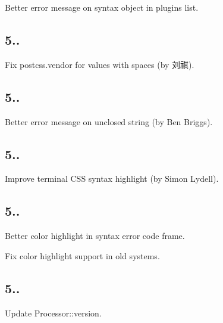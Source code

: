 \begin{DoxyItemize}
\item Better error message on syntax object in plugins list.
\end{DoxyItemize}

\subsection*{5..}


\begin{DoxyItemize}
\item Fix {\ttfamily postcss.\+vendor} for values with spaces (by 刘祺).
\end{DoxyItemize}

\subsection*{5..}


\begin{DoxyItemize}
\item Better error message on unclosed string (by Ben Briggs).
\end{DoxyItemize}

\subsection*{5..}


\begin{DoxyItemize}
\item Improve terminal C\+SS syntax highlight (by Simon Lydell).
\end{DoxyItemize}

\subsection*{5..}


\begin{DoxyItemize}
\item Better color highlight in syntax error code frame.
\item Fix color highlight support in old systems.
\end{DoxyItemize}

\subsection*{5..}


\begin{DoxyItemize}
\item Update {\ttfamily Processor\+::version}.
\end{DoxyItemize}

